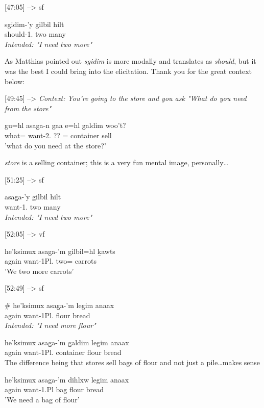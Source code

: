 [47:05] --> sf
\begin{exe}
\ex \gll sgidim-'y gilbil hilt\\
should-1.\Ii{} two many\\
\textit{Intended: "I need two more"}
\end{exe}

As Matthias pointed out \textit{sgidim} is more modally and translates as \textit{should}, but it was the best I could bring into the elicitation. Thank you for the great context below:

[49:45] --> \textit{Context: You're going to the store and you ask "What do you need from the store"}
\begin{exe}
\ex \gll gu=hl asag̱a-n gaa e=hl g̱aldim woo't?\\
what=\Cn{} want-2.\Ii{} ?? \Prep{}=\Cn{} container sell \\
'what do you need at the store?'
\end{exe}

\textit{store} is a selling container; this is a very fun mental image, personally\dots

[51:25] --> sf
\begin{exe}
    \ex \gll * asag̱a-'y gilbil hilt\\
    {} want-1.\Ii{} two many\\
\textit{Intended: "I need two more"}
\end{exe}

[52:05] --> vf
\begin{exe}
\ex \gll he'ksimux asag̱a-'m gilbil=hl ḵawts\\
again want-1Pl.\Ii{} two=\Cn{} carrots\\
'We two more carrots'
\end{exe}

[52:49] --> sf
\begin{exe}
\ex \begin{xlist}
\item \gll \# he'ksimux asag̱a-'m legim anaax\\
{} again want-1Pl.\Ii{} flour bread\\
\textit{Intended: "I need more flour"}
\item \gll he'ksimux asag̱a-'m g̱aldim legim anaax\\
again want-1Pl.\Ii{} container flour bread\\
The difference being that stores sell bags of flour and not just a pile\dots makes sense
\item \gll he'ksimux asag̱a-'m dihlxw legim anaax\\
again want-1.Pl\Ii{} bag flour bread\\
'We need a bag of flour'
\end{xlist}
\end{exe}


